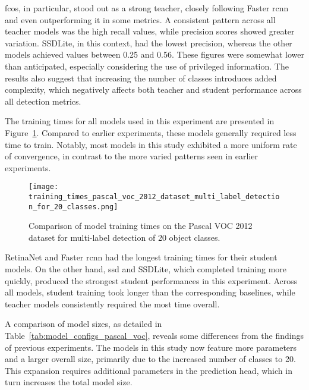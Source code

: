 \gls{fcos}, in particular, stood out as a strong teacher, closely following Faster \gls{rcnn} and even outperforming it in some metrics. A consistent pattern across all teacher models was the high recall values, while precision scores showed greater variation. SSDLite, in this context, had the lowest precision, whereas the other models achieved values between 0.25 and 0.56. These figures were somewhat lower than anticipated, especially considering the use of privileged information. The results also suggest that increasing the number of classes introduces added complexity, which negatively affects both teacher and student performance across all detection metrics.

The training times for all models used in this experiment are presented in Figure~\ref{fig:pascal_voc_training_time}. Compared to earlier experiments, these models generally required less time to train. Notably, most models in this study exhibited a more uniform rate of convergence, in contrast to the more varied patterns seen in earlier experiments.

\begin{figure}[!ht]
    \centering
    \texttt{[image: training\_times\_pascal\_voc\_2012\_dataset\_multi\_label\_detection\_for\_20\_classes.png]}
    \caption{Comparison of model training times on the Pascal VOC 2012 dataset for multi-label detection of 20 object classes.}
    \label{fig:pascal_voc_training_time}
\end{figure}

RetinaNet and Faster \gls{rcnn} had the longest training times for their student models. On the other hand, \gls{ssd} and SSDLite, which completed training more quickly, produced the strongest student performances in this experiment. Across all models, student training took longer than the corresponding baselines, while teacher models consistently required the most time overall.

A comparison of model sizes, as detailed in Table~\ref{tab:model_configs_pascal_voc}, reveals some differences from the findings of previous experiments. The models in this study now feature more parameters and a larger overall size, primarily due to the increased number of classes to 20. This expansion requires additional parameters in the prediction head, which in turn increases the total model size.

